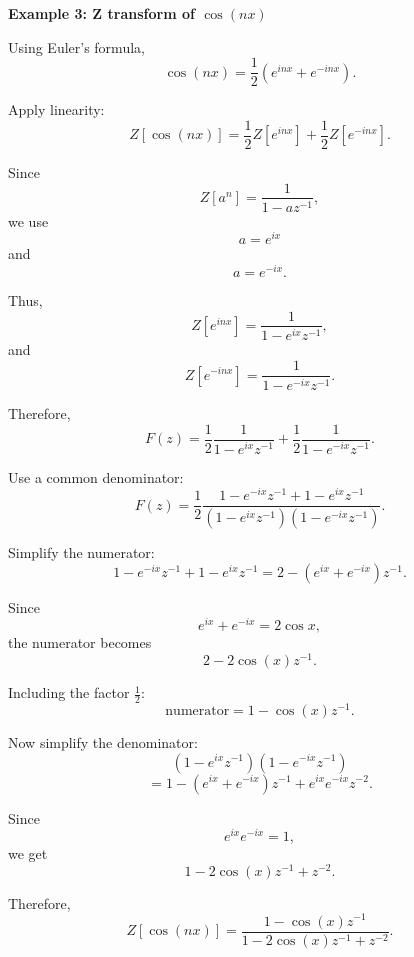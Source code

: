 \begin{examplebox}
    \textbf{Example 3: Z transform of $\cos(nx)$}

    Using Euler's formula,
    \[
        \cos(nx)=\frac{1}{2}\left(e^{inx}+e^{-inx}\right).
    \]

    Apply linearity:
    \[
        Z[\cos(nx)]
        =
        \frac{1}{2}Z[e^{inx}]
        +
        \frac{1}{2}Z[e^{-inx}].
    \]

    Since
    \[
        Z[a^n]=\frac{1}{1-az^{-1}},
    \]
    we use
    \[
        a=e^{ix}
    \]
    and
    \[
        a=e^{-ix}.
    \]

    Thus,
    \[
        Z[e^{inx}]
        =
        \frac{1}{1-e^{ix}z^{-1}},
    \]
    and
    \[
        Z[e^{-inx}]
        =
        \frac{1}{1-e^{-ix}z^{-1}}.
    \]

    Therefore,
    \[
        F(z)
        =
        \frac{1}{2}
        \frac{1}{1-e^{ix}z^{-1}}
        +
        \frac{1}{2}
        \frac{1}{1-e^{-ix}z^{-1}}.
    \]

    Use a common denominator:
    \[
        F(z)
        =
        \frac{1}{2}
        \frac{1-e^{-ix}z^{-1}+1-e^{ix}z^{-1}}
        {(1-e^{ix}z^{-1})(1-e^{-ix}z^{-1})}.
    \]

    Simplify the numerator:
    \[
        1-e^{-ix}z^{-1}+1-e^{ix}z^{-1}
        =
        2-(e^{ix}+e^{-ix})z^{-1}.
    \]

    Since
    \[
        e^{ix}+e^{-ix}=2\cos x,
    \]
    the numerator becomes
    \[
        2-2\cos(x)z^{-1}.
    \]

    Including the factor $\frac{1}{2}$:
    \[
        \text{numerator}=1-\cos(x)z^{-1}.
    \]

    Now simplify the denominator:
    \[
        (1-e^{ix}z^{-1})(1-e^{-ix}z^{-1})
    \]
    \[
        =
        1-(e^{ix}+e^{-ix})z^{-1}+e^{ix}e^{-ix}z^{-2}.
    \]

    Since
    \[
        e^{ix}e^{-ix}=1,
    \]
    we get
    \[
        1-2\cos(x)z^{-1}+z^{-2}.
    \]

    Therefore,
    \[
        \boxed{
            Z[\cos(nx)]
            =
            \frac{1-\cos(x)z^{-1}}
            {1-2\cos(x)z^{-1}+z^{-2}}
        }.
    \]
\end{examplebox}

